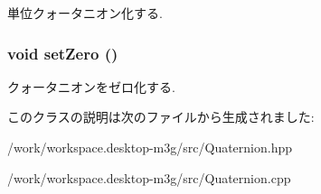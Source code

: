 単位クォータニオン化する. \hypertarget{classm3g_1_1Quaternion_47affd1a10b589811fc4828c1a2e0c6d}{
\subsubsection[{setZero}]{\setlength{\rightskip}{0pt plus 5cm}void setZero ()}}
\label{classm3g_1_1Quaternion_47affd1a10b589811fc4828c1a2e0c6d}


クォータニオンをゼロ化する. 

このクラスの説明は次のファイルから生成されました:\begin{CompactItemize}
\item 
/work/workspace.desktop-m3g/src/Quaternion.hpp\item 
/work/workspace.desktop-m3g/src/Quaternion.cpp\end{CompactItemize}
